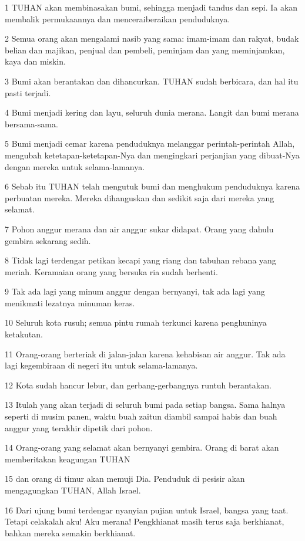 \par 1 TUHAN akan membinasakan bumi, sehingga menjadi tandus dan sepi. Ia akan membalik permukaannya dan menceraiberaikan penduduknya.
\par 2 Semua orang akan mengalami nasib yang sama: imam-imam dan rakyat, budak belian dan majikan, penjual dan pembeli, peminjam dan yang meminjamkan, kaya dan miskin.
\par 3 Bumi akan berantakan dan dihancurkan. TUHAN sudah berbicara, dan hal itu pasti terjadi.
\par 4 Bumi menjadi kering dan layu, seluruh dunia merana. Langit dan bumi merana bersama-sama.
\par 5 Bumi menjadi cemar karena penduduknya melanggar perintah-perintah Allah, mengubah ketetapan-ketetapan-Nya dan mengingkari perjanjian yang dibuat-Nya dengan mereka untuk selama-lamanya.
\par 6 Sebab itu TUHAN telah mengutuk bumi dan menghukum penduduknya karena perbuatan mereka. Mereka dihanguskan dan sedikit saja dari mereka yang selamat.
\par 7 Pohon anggur merana dan air anggur sukar didapat. Orang yang dahulu gembira sekarang sedih.
\par 8 Tidak lagi terdengar petikan kecapi yang riang dan tabuhan rebana yang meriah. Keramaian orang yang bersuka ria sudah berhenti.
\par 9 Tak ada lagi yang minum anggur dengan bernyanyi, tak ada lagi yang menikmati lezatnya minuman keras.
\par 10 Seluruh kota rusuh; semua pintu rumah terkunci karena penghuninya ketakutan.
\par 11 Orang-orang berteriak di jalan-jalan karena kehabisan air anggur. Tak ada lagi kegembiraan di negeri itu untuk selama-lamanya.
\par 12 Kota sudah hancur lebur, dan gerbang-gerbangnya runtuh berantakan.
\par 13 Itulah yang akan terjadi di seluruh bumi pada setiap bangsa. Sama halnya seperti di musim panen, waktu buah zaitun diambil sampai habis dan buah anggur yang terakhir dipetik dari pohon.
\par 14 Orang-orang yang selamat akan bernyanyi gembira. Orang di barat akan memberitakan keagungan TUHAN
\par 15 dan orang di timur akan memuji Dia. Penduduk di pesisir akan mengagungkan TUHAN, Allah Israel.
\par 16 Dari ujung bumi terdengar nyanyian pujian untuk Israel, bangsa yang taat. Tetapi celakalah aku! Aku merana! Pengkhianat masih terus saja berkhianat, bahkan mereka semakin berkhianat.
